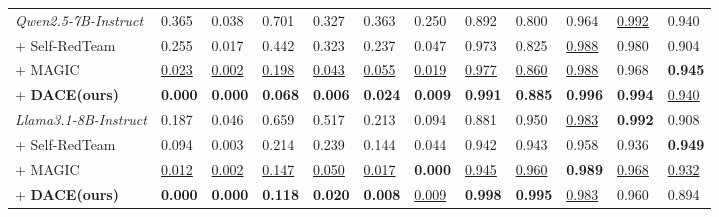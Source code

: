 \documentclass{article}
\newcommand{\method}{\textsc{DACE}\xspace}
\begin{document}
\begin{table}[t]
\begin{tabularx}{\textwidth}{l Y Y Y Y Y Y P{1.35cm} Y P{1.65cm} P{1.20cm} P{1.35cm}}
\textit{Qwen2.5-7B-Instruct} & 0.365 & 0.038 & 0.701 & 0.327 & 0.363 & 0.250 & 0.892 & 0.800 & 0.964 & \underline{0.992} & 0.940 \\
\quad + Self-RedTeam & 0.255 & 0.017 & 0.442 & 0.323 & 0.237 & 0.047 & 0.973 & 0.825 & \underline{0.988} & 0.980 & 0.904 \\
\quad + MAGIC        & \underline{0.023} & \underline{0.002} & \underline{0.198} & \underline{0.043} & \underline{0.055} & \underline{0.019} & \underline{0.977} & \underline{0.860} & \underline{0.988} & 0.968 & \textbf{0.945} \\
\quad + \textbf{\method (ours)} &
\textbf{0.000} & \textbf{0.000} & \textbf{0.068} & \textbf{0.006} & \textbf{0.024} & \textbf{0.009} & \textbf{0.991} & \textbf{0.885} & \textbf{0.996} & \textbf{0.994} & \underline{0.940} \\
\addlinespace[0.35em]

\textit{Llama3.1-8B-Instruct} & 0.187 & 0.046 & 0.659 & 0.517 & 0.213 & 0.094 & 0.881 & 0.950 & \underline{0.983} & \textbf{0.992} & 0.908 \\
\quad + Self-RedTeam          & 0.094 & 0.003 & 0.214 & 0.239 & 0.144 & 0.044 & 0.942 & 0.943 & 0.958 & 0.936 & \textbf{0.949} \\
\quad + MAGIC                 & \underline{0.012} & \underline{0.002} & \underline{0.147} & \underline{0.050} & \underline{0.017} & \textbf{0.000} & \underline{0.945} & \underline{0.960} & \textbf{0.989} & \underline{0.968} & \underline{0.932} \\
\quad + \textbf{\method (ours)} &
\textbf{0.000} & \textbf{0.000} & \textbf{0.118} & \textbf{0.020} & \textbf{0.008} & \underline{0.009} & \textbf{0.998} & \textbf{0.995} & \underline{0.983} & 0.960 & 0.894 \\
\bottomrule
\end{tabularx}
\end{table}
\end{document}
